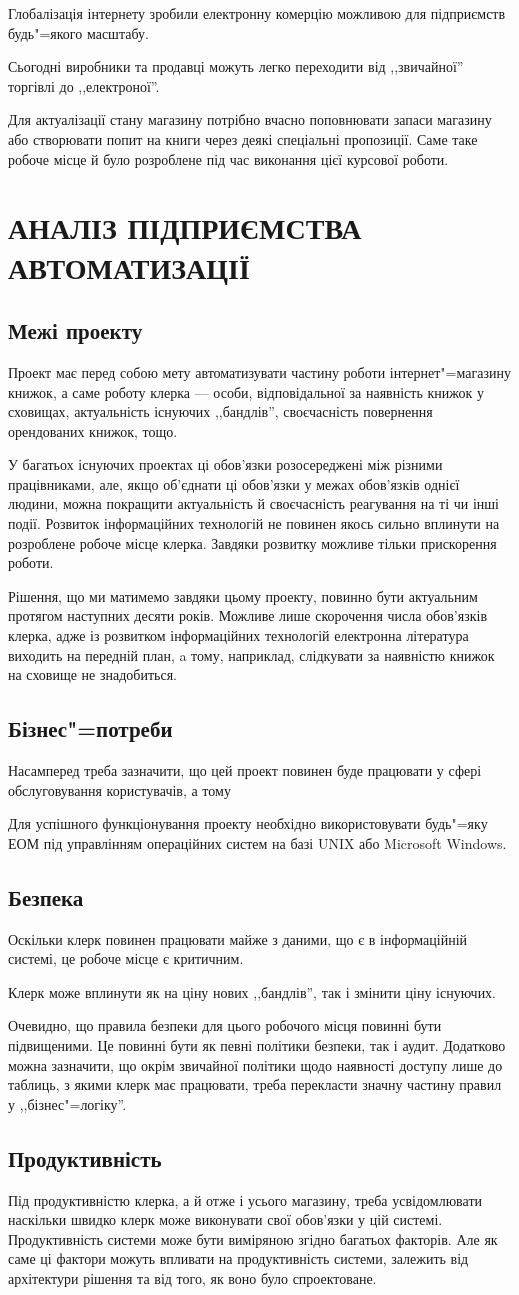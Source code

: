 \documentclass[a4paper,notitlepage,headsepline,pdftex,oneside]{report}
\newcommand{\setfontsize}[1]{\fontsize{#1pt}{#1pt}\selectfont}
\newcommand{\Chapter}[1]{\chapter{#1} \renewcommand{\baselinestretch}{1.5}\setfontsize{14pt}}
\newcommand{\Section}[1]{\section{#1} \renewcommand{\baselinestretch}{1.5}\setfontsize{14pt}}
\begin{document}
  Глобалізація інтернету зробили електронну комерцію можливою для підприємств
  будь"=якого масштабу.

  Сьогодні виробники та продавці можуть легко переходити від ,,звичайної''
  торгівлі до ,,електроної''.

  Для актуалізації стану магазину потрібно вчасно поповнювати запаси магазину
  або створювати попит на книги через деякі спеціальні пропозиції.
  Саме таке робоче місце й було розроблене під час виконання цієї курсової
  роботи.
\Chapter{АНАЛІЗ ПІДПРИЄМСТВА АВТОМАТИЗАЦІЇ}
  \Section{Межі проекту}
    Проект має перед собою мету автоматизувати частину роботи
    інтернет"=магазину книжок, а саме роботу клерка --- особи, відповідальної
    за наявність книжок у сховищах, актуальність існуючих ,,бандлів'',
    своєчасність повернення орендованих книжок, тощо.

    У багатьох існуючих проектах ці обов’язки розосереджені між різними
    працівниками, але, якщо об’єднати ці обов’язки у межах обов’язків однієї
    людини, можна покращити актуальність й своєчасність реагування на ті чи
    інші події.
    Розвиток інформаційних технологій не повинен якось сильно вплинути на
    розроблене робоче місце клерка.
    Завдяки розвитку можливе тільки прискорення роботи.

    Рішення, що ми матимемо завдяки цьому проекту, повинно бути актуальним
    протягом наступних десяти років.
    Можливе лише скорочення числа обов’язків клерка, адже із розвитком
    інформаційних технологій електронна література виходить на передній план,
    a тому, наприклад, слідкувати за наявністю книжок на сховище не
    знадобиться.
  \Section{Бізнес"=потреби}
    Насамперед треба зазначити, що цей проект повинен буде працювати у сфері
    обслуговування користувачів, а тому

    Для успішного функціонування проекту необхідно використовувати будь"=яку
    ЕОМ під управлінням операційних систем на базі UNIX або
    Microsoft Windows.

  \Section{Безпека}
    Оскільки клерк повинен працювати майже з даними, що є в інформаційній
    системі, це робоче місце є критичним.

    Клерк може вплинути як на ціну нових ,,бандлів'', так і змінити ціну
    існуючих.

    Очевидно, що правила безпеки для цього робочого місця повинні бути
    підвищеними.
    Це повинні бути як певні політики безпеки, так і аудит.
    Додатково можна зазначити, що окрім звичайної політики щодо наявності
    доступу лише до таблиць, з якими клерк має працювати, треба перекласти
    значну частину правил у ,,бізнес"=логіку''.
  \Section{Продуктивність}
    Під продуктивністю клерка, а й отже і усього магазину, треба
    усвідомлювати наскільки швидко клерк може виконувати свої обов’язки у цій
    системі.
    Продуктивність системи може бути виміряною згідно багатьох факторів.
    Але як саме ці фактори можуть впливати на продуктивність системи, залежить
    від архітектури рішення та від того, як воно було спроектоване.
\end{document}
